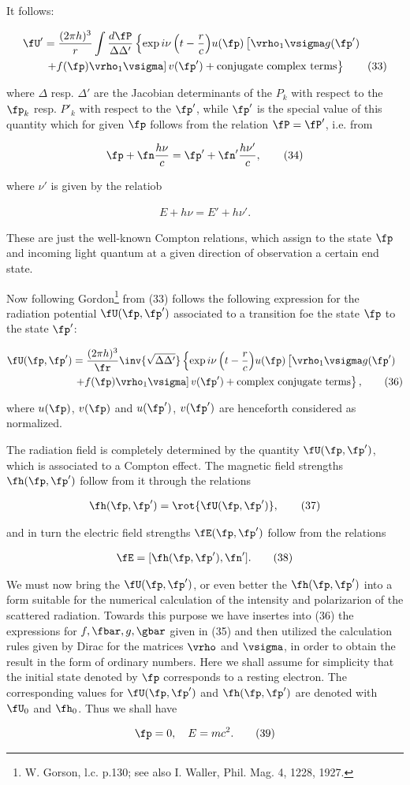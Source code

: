 \documentclass{article}
\newcommand{\nequ}[2]{
\begin{align*}
#1
\tag{#2}
\end{align*}
}
\begin{document}
It follows:
\nequ{
\fU' &= \frac{(2\pi h)^3}{r}\int{\frac{{d\fP}}{\Delta\Delta'}}\left\{
\exp{i\nu\left(t-\frac{r}{c}\right)}u(\fp)\left[\vrho_1 \vsigma g(\fp')\right.\right.\\
&\left.\left. + f(\fp)\vrho_1 \vsigma\right]v(\fp') + \text{conjugate complex terms}
\right\}
}{33}
where $\Delta$ resp. $\Delta'$ are the Jacobian determinants of the $P_k$ with respect to the $\fp_k$ resp. $P'_k$ with respect to the $\fp'$, while $\fp'$ is the special value of this quantity which for given $\fp$ follows from the relation $\fP = \fP'$, i.e. from
\nequ{
\fp + \fn\frac{h\nu}{c} = \fp' + \fn'\frac{h\nu'}{c},
}{34}
where $\nu'$ is given by the relatiob
\nequ{
E+h\nu = E' + h\nu'.
}{35}
These are just the well-known Compton relations, which assign to the state $\fp$ and incoming light quantum at a given direction of observation a certain end state.

Now following Gordon\footnote{W. Gorson, l.c. p.130; see also I. Waller, Phil. Mag. 4, 1228, 1927.} from (33) follows the following expression for the radiation potential $\fU(\fp,\fp')$ associated to a transition foe the state $\fp$ to the state $\fp'$:
\nequ{
\fU(\fp,\fp') &= \frac{(2\pi h)^3}{\fr}\inv{\sqrt{\Delta\Delta'}}\left\{
\exp{i\nu\left(t-\frac{r}{c}\right)}u(\fp)\left[\vrho_1\vsigma g(\fp')\right.\right.\\
&\left.\left. + f(\fp)\vrho_1 \vsigma\right]v(\fp')
+ \text{complex conjugate terms}\right\},
}{36}
where $u(\fp)$, $v(\fp)$ and $u(\fp')$, $v(\fp')$ are henceforth considered as normalized.

The radiation field is completely determined by the quantity $\fU(\fp,\fp')$, which is associated to a  Compton effect. The magnetic field strengths $\fh(\fp,\fp')$ follow from it through the relations
\nequ{
\fh(\fp,\fp') = \rot{\fU(\fp,\fp')},
}{37}
and in turn the electric field strengths $\fE(\fp,\fp')$ follow from the relations
\nequ{
\fE = [\fh(\fp,\fp'), \fn'].
}{38}
We must now bring the $\fU(\fp,\fp')$, or even better the $\fh(\fp,\fp')$ into a form suitable for the numerical calculation of the intensity and polarizarion of the scattered radiation. Towards this purpose we have insertes into (36) the expressions for $f,\fbar,g,\gbar$ given in (35) and then utilized the calculation rules given by Dirac for the matrices $\vrho$ and $\vsigma$, in order to obtain the result in the form of ordinary numbers. Here we shall assume for simplicity that the initial state denoted by $\fp$ corresponds to a resting electron. The corresponding values for $\fU(\fp,\fp')$ and $\fh(\fp,\fp')$ are denoted with $\fU_0$ and $\fh_0$. Thus we shall have
\nequ{
\fp=0,\quad E=mc^2.
}{39}
\end{document}
